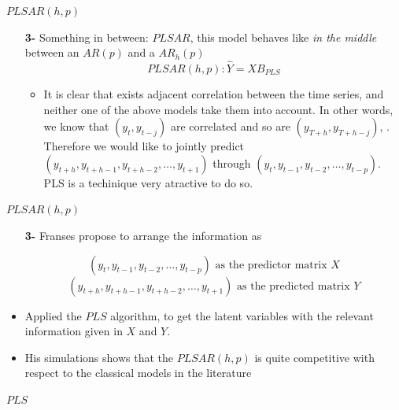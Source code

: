 \documentclass{beamer}
\newcommand{\?}{?`}
\begin{document}
\begin{frame}{$PLSAR(h,p)$}
  \begin{itemize}
  \item[\textbf{3-}] Something in between: $PLSAR$, this model behaves like {\it{ in the middle }}between an $AR(p)$ and a $AR_h(p)$  
    \begin{displaymath}
      PLSAR(h,p): \hat{Y}=XB_{PLS}
    \end{displaymath}
    \begin{itemize}
    \item It is clear that exists adjacent correlation between the time series, and neither one of the above models take them into account. In other words, we know that $(y_t,y_{t-j})$ are correlated and so are $(y_{T+h},y_{T+h-j})$, . Therefore we would like to jointly predict $(y_{t+h},y_{t+h-1},y_{t+h-2},\ldots,y_{t+1})$ through $(y_{t},y_{t-1},y_{t-2},\ldots,y_{t-p})$. PLS is a techinique very atractive to do so.
    \end{itemize}
  \end{itemize}
\end{frame}

\begin{frame}{$PLSAR(h,p)$}
  \begin{itemize}
  \item[\textbf{3-}]   Franses propose to arrange the information as 

      \begin{displaymath}
        (y_{t},y_{t-1},y_{t-2},\ldots,y_{t-p}) \text{ as the predictor matrix
           } X
      \end{displaymath}
      \begin{displaymath}
        (y_{t+h},y_{t+h-1},y_{t+h-2},\ldots,y_{t+1})
        \text{ as the predicted matrix } Y
      \end{displaymath}
      \bigskip
      \item Applied the $PLS$ algorithm, to get the latent variables with the relevant information given in $X $ and $Y$.
      \medskip
     \item His simulations shows that the $PLSAR(h,p)$ is quite competitive with respect to the classical models in the literature
  \end{itemize}
\end{frame}

\begin{frame}{}
  \begin{block}{}
    \begin{center}
      \vspace{3mm}
      {\Large $PLS$}
      \vspace{3mm}
    \end{center}
  \end{block}
\end{frame}
\end{document}
